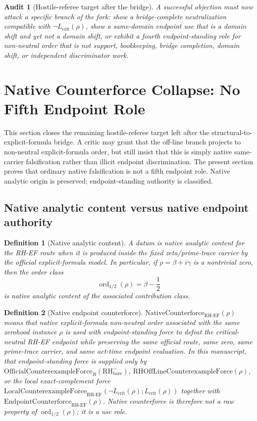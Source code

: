 \documentclass[11pt]{article}
\newtheorem{definition}{Definition}[section]
\newtheorem{audit}{Audit}[section]
\newcommand{\Lcrit}{L_{\mathrm{crit}}}
\newcommand{\RH}{\mathrm{RH}}
\newcommand{\EF}{\mathrm{EF}}
\newcommand{\OfficialCxForce}{\mathrm{OfficialCounterexampleForce}}
\newcommand{\LocalCxForce}{\mathrm{LocalCounterexampleForce}}
\newcommand{\RHOffCxForce}{\mathrm{RHOffLineCounterexampleForce}}
\newcommand{\Counterforce}{\mathrm{EndpointCounterforce}}
\newcommand{\ordhalf}{\operatorname{ord}_{1/2}}
\newcommand{\NativeCounterforce}{\mathrm{NativeCounterforce}}
\begin{document}
\begin{audit}[Hostile-referee target after the bridge]
A successful objection must now attack a specific branch of the fork: show a bridge-complete neutralization compatible with \(\neg\Lcrit(\rho)\), show a same-domain endpoint use that is a domain shift and yet not a domain shift, or exhibit a fourth endpoint-standing role for non-neutral order that is not support, bookkeeping, bridge completion, domain shift, or independent discriminator work.
\end{audit}


\section{Native Counterforce Collapse: No Fifth Endpoint Role}\label{sec:native-counterforce-collapse}

This section closes the remaining hostile-referee target left after the structural-to-explicit-formula bridge.  A critic may grant that the off-line branch projects to non-neutral explicit-formula order, but still insist that this is simply native same-carrier falsification rather than illicit endpoint discrimination.  The present section proves that ordinary native falsification is not a fifth endpoint role.  Native analytic origin is preserved; endpoint-standing authority is classified.

\subsection{Native analytic content versus native endpoint authority}

\begin{definition}[Native analytic content]
A datum is native analytic content for the RH-EF route when it is produced inside the fixed zeta/prime-trace carrier by the official explicit-formula model.  In particular, if \(\rho=\beta+i\gamma\) is a nontrivial zero, then the order class
\[
\ordhalf(\rho)=\beta-\frac12
\]
is native analytic content of the associated contribution class.
\end{definition}

\begin{definition}[Native endpoint counterforce]
\(\NativeCounterforce_{\RH\text{-}\EF}(\rho)\) means that native explicit-formula non-neutral order associated with the same zerohood instance \(\rho\) is used with endpoint-standing force to defeat the critical-neutral RH-EF endpoint while preserving the same official route, same zero, same prime-trace carrier, and same act-time endpoint evaluation.  In this manuscript, that endpoint-standing force is supplied only by \(\OfficialCxForce_R(\RH^-_{\mathrm{bare}})\), \(\RHOffCxForce(\rho)\), or the local exact-complement force \(\LocalCxForce_{\RH\text{-}\EF}(\neg\Lcrit(\rho);\Lcrit(\rho))\) together with \(\Counterforce_{\RH\text{-}\EF}(\rho)\).  Native counterforce is therefore not a raw property of \(\ordhalf(\rho)\); it is a use role.
\end{definition}
\end{document}
